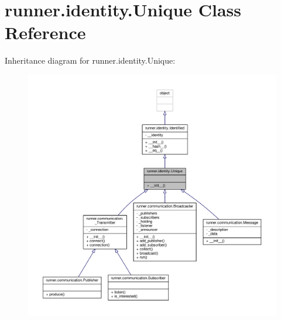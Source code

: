 \hypertarget{classrunner_1_1identity_1_1Unique}{}\section{runner.\+identity.\+Unique Class Reference}
\label{classrunner_1_1identity_1_1Unique}


Inheritance diagram for runner.\+identity.\+Unique\+:
\nopagebreak
\begin{figure}[H]
\begin{center}
\leavevmode
\includegraphics[width=350pt]{classrunner_1_1identity_1_1Unique__inherit__graph}
\end{center}
\end{figure}


